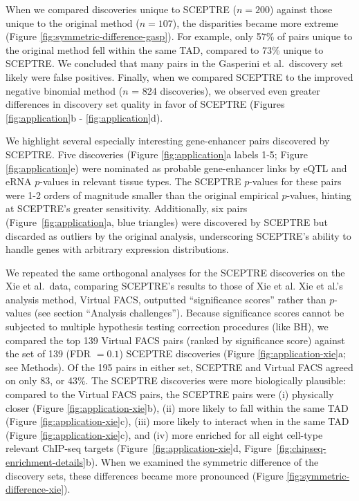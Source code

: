 \documentclass{article}
\begin{document}
When we compared discoveries unique to SCEPTRE ($n = 200$) against those unique to the original method ($n = 107$), the disparities became more extreme (Figure \ref{fig:symmetric-difference-gasp}). For example, only 57\% of pairs unique to the original method fell within the same TAD, compared to 73\% unique to SCEPTRE. We concluded that many pairs in the Gasperini et al.\ discovery set likely were false positives. Finally, when we compared SCEPTRE to the improved negative binomial method ($n$ = 824 discoveries), we observed even greater differences in discovery set quality in favor of SCEPTRE (Figures \ref{fig:application}b - \ref{fig:application}d).

We highlight several especially interesting gene-enhancer pairs discovered by SCEPTRE. Five discoveries (Figure \ref{fig:application}a labels 1-5; Figure \ref{fig:application}e) were nominated as probable gene-enhancer links by eQTL\cite{GTExPilot} and eRNA\cite{Andersson2014} $p$-values in relevant tissue types. The SCEPTRE $p$-values for these pairs were 1-2 orders of magnitude smaller than the original empirical $p$-values, hinting at SCEPTRE's greater sensitivity. Additionally, six pairs (Figure~\ref{fig:application}a, blue triangles) were discovered by SCEPTRE but discarded as outliers by the original analysis, underscoring SCEPTRE's ability to handle genes with arbitrary expression distributions.

We repeated the same orthogonal analyses for the SCEPTRE discoveries on the Xie et al.\ data, comparing SCEPTRE's results to those of Xie et al. Xie et al.'s analysis method, Virtual FACS, outputted ``significance scores'' rather than $p$-values (see section ``Analysis challenges''). Because significance scores cannot be subjected to multiple hypothesis testing correction procedures (like BH), we compared the top 139 Virtual FACS pairs (ranked by significance score) against the set of 139 (FDR $= 0.1$) SCEPTRE discoveries (Figure \ref{fig:application-xie}a; see Methods). Of the 195 pairs in either set, SCEPTRE and Virtual FACS agreed on only 83, or 43\%. The SCEPTRE discoveries were more biologically plausible: compared to the Virtual FACS pairs, the SCEPTRE pairs were (i) physically closer (Figure \ref{fig:application-xie}b), (ii) more likely to fall within the same TAD (Figure \ref{fig:application-xie}c), (iii) more likely to interact when in the same TAD (Figure \ref{fig:application-xie}c), and (iv) more enriched for all eight cell-type relevant ChIP-seq targets (Figure~\ref{fig:application-xie}d, Figure~\ref{fig:chipseq-enrichment-details}b). When we examined the symmetric difference of the discovery sets, these differences became more pronounced (Figure \ref{fig:symmetric-difference-xie}).
\end{document}
